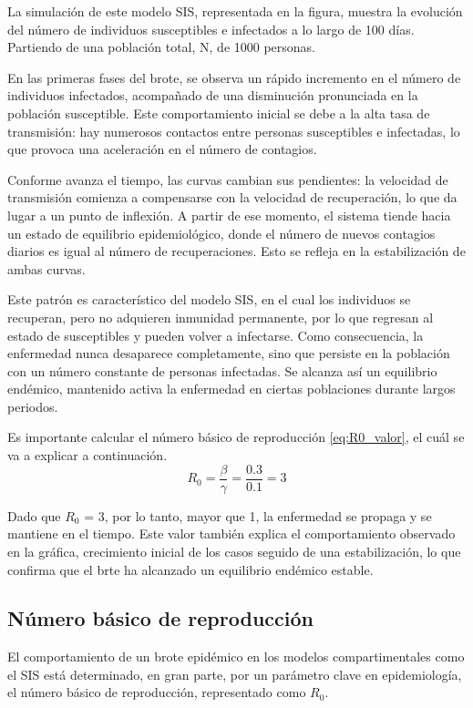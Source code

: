La simulación de este modelo SIS, representada en la figura, muestra la evolución del número de individuos susceptibles e infectados a lo largo de 100 días. Partiendo de una población total, N, de 1000 personas.

En las primeras fases del brote, se observa un rápido incremento en el número de individuos infectados, acompañado de una disminución pronunciada en la población susceptible. Este comportamiento inicial se debe a la alta tasa de transmisión: hay numerosos contactos entre personas susceptibles e infectadas, lo que provoca una aceleración en el número de contagios.

Conforme avanza el tiempo, las curvas cambian sus pendientes: la velocidad de transmisión comienza a compensarse con la velocidad de recuperación, lo que da lugar a un punto de inflexión. A partir de ese momento, el sistema tiende hacia un estado de equilibrio epidemiológico, donde el número de nuevos contagios diarios es igual al número de recuperaciones. Esto se refleja en la estabilización de ambas curvas.

Este patrón es característico del modelo SIS, en el cual los individuos se recuperan, pero no adquieren inmunidad permanente, por lo que regresan al estado de susceptibles y pueden volver a infectarse. Como consecuencia, la enfermedad nunca desaparece completamente, sino que persiste en la población con un número constante de personas infectadas. Se alcanza así un equilibrio endémico, mantenido activa la enfermedad en ciertas poblaciones durante largos periodos.

Es importante calcular el número básico de reproducción \eqref{eq:R0_valor}, el cuál se va a explicar a continuación.
\begin{equation}
R_0 = \frac{\beta}{\gamma} = \frac{0.3}{0.1} = 3
\label{eq:R0_valor}
\end{equation}

Dado que $R_0$ = 3, por lo tanto, mayor que 1, la enfermedad se propaga y se mantiene en el tiempo. Este valor también explica el comportamiento observado en la gráfica, crecimiento inicial de los casos seguido de una estabilización, lo que confirma que el brte ha alcanzado un equilibrio endémico estable.




\subsection{Número básico de reproducción}
El comportamiento de un brote epidémico en los modelos compartimentales como el SIS está determinado, en gran parte, por un parámetro clave en epidemiología, el número básico de reproducción, representado como $R_0$.


